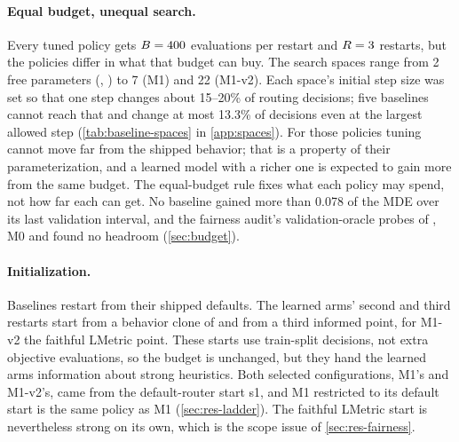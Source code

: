 \paragraph{Equal budget, unequal search.}
Every tuned policy gets $B = 400$ evaluations per restart and $R = 3$ restarts, but
the policies differ in what that budget can buy. The search spaces range from 2 free parameters
(, ) to 7 (M1) and 22 (M1-v2). Each space's initial step size was set so that one
step changes about 15--20\% of routing decisions; five baselines cannot reach that and change at
most 13.3\% of decisions even at the largest allowed step (\cref{tab:baseline-spaces} in
\cref{app:spaces}). For those policies tuning cannot move far from the shipped behavior; that is a
property of their parameterization, and a learned model with a richer one is expected to gain more
from the same budget. The equal-budget rule fixes what each policy may spend, not how far each can
get. No baseline gained more than 0.078 of the MDE over its last validation interval, and the
fairness audit's validation-oracle probes of , M0 and 
found no headroom (\cref{sec:budget}).

\paragraph{Initialization.}
Baselines restart from their shipped defaults. The learned arms' second and third restarts start
from a behavior clone of  and from a third informed point, for M1-v2 the
faithful LMetric point. These starts use train-split decisions, not extra objective evaluations, so
the budget is unchanged, but they hand the learned arms information about strong heuristics. Both
selected configurations, M1's and M1-v2's, came from the default-router start s1, and M1 restricted
to its default start is the same policy as M1 (\cref{sec:res-ladder}). The faithful LMetric start is
nevertheless strong on its own, which is the scope issue of \cref{sec:res-fairness}.

